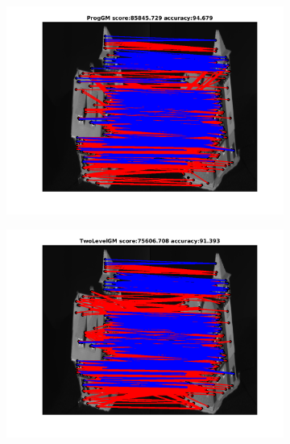 \begin{figure}[h] 	
	\begin{subfigure}[b]{0.3\textwidth}
		\centering
		\includegraphics[scale=0.25]{"chapter3/fig/HouseSeq/anchor_descr/using_cpd_afftrafo/ext_solution/fi_4_ProgGM"}  
	\end{subfigure}%
	\begin{subfigure}[b]{0.3\textwidth}
		\centering
		\includegraphics[scale=0.25]{"chapter3/fig/HouseSeq/anchor_descr/using_cpd_afftrafo/ext_solution/fi_4_TwoLevelGM"}  
	\end{subfigure} 
	\begin{subfigure}[b]{0.3\textwidth}
		\centering

\end{subfigure}
\end{figure}
